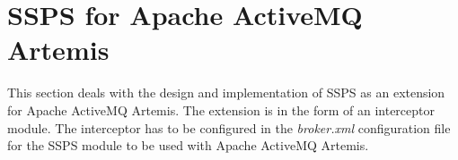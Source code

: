 \section{SSPS for Apache ActiveMQ Artemis}

This section deals with the design and implementation of SSPS as an extension for Apache ActiveMQ Artemis. The extension is in the form of an interceptor module. The interceptor has to be configured in the \textit{broker.xml} configuration file for the SSPS module to be used with Apache ActiveMQ Artemis.




